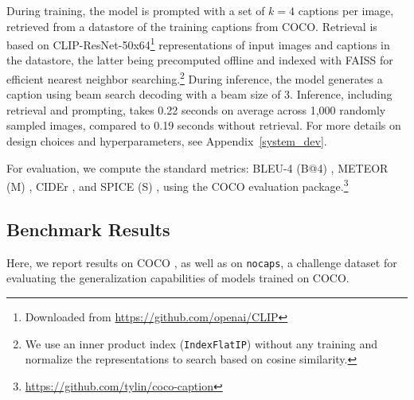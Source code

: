\documentclass[10pt,twocolumn,letterpaper]{article}
\begin{document}
During training, the model is prompted with a set of $k=4$ captions per image, retrieved from a datastore of the training captions from COCO. 
Retrieval is based on CLIP-ResNet-50x64\footnote{Downloaded from \url{https://github.com/openai/CLIP}} representations of input images and captions in the datastore, the latter being precomputed offline and indexed with FAISS \cite{JDH17} for efficient nearest neighbor searching.\footnote{We use an inner product index (\texttt{IndexFlatIP}) without any training and normalize the representations to search based on cosine similarity.} During inference, the model generates a caption using beam search decoding with a beam size of 3. Inference, including retrieval and prompting, takes 0.22 seconds on average across 1,000 randomly sampled images, compared to 0.19 seconds without retrieval. For more details on design choices and hyperparameters, see Appendix~\ref{system_dev}.


For evaluation, we compute the standard metrics: BLEU-4 (B@4) \cite{papineni2002bleu}, METEOR (M) \cite{denkowski2014meteor}, CIDEr \cite{vedantam2015cider}, and SPICE (S) \cite{anderson2016spice}, using the COCO evaluation package.\footnote{\url{https://github.com/tylin/coco-caption}}

\subsection{Benchmark Results}
\label{results}

Here, we report results on COCO \cite{chen2015microsoft}, as well as on \texttt{nocaps}\cite{Agrawal_2019}, a challenge dataset for evaluating the generalization capabilities of models trained on COCO.
\end{document}
